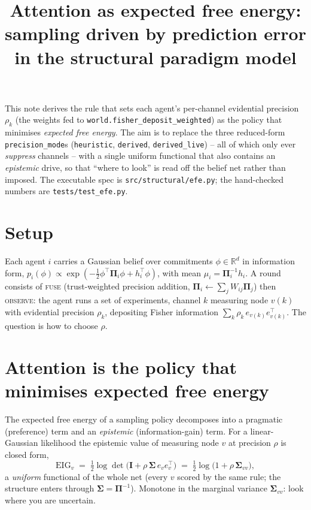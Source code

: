 \documentclass[11pt]{article}
\title{Attention as expected free energy:\\
sampling driven by prediction error in the structural paradigm model}
\author{}
\date{}
\newcommand{\Pib}{\boldsymbol{\Pi}}
\newcommand{\Sib}{\boldsymbol{\Sigma}}
\begin{document}
\maketitle

\noindent
This note derives the rule that sets each agent's per-channel evidential precision
$\rho_k$ (the weights fed to \texttt{world.fisher\_deposit\_weighted}) as the policy that
minimises \emph{expected free energy}. The aim is to replace the three reduced-form
\texttt{precision\_mode}s (\texttt{heuristic}, \texttt{derived}, \texttt{derived\_live}) --
all of which only ever \emph{suppress} channels -- with a single uniform functional that also
contains an \emph{epistemic} drive, so that ``where to look'' is read off the belief net
rather than imposed. The executable spec is \texttt{src/structural/efe.py}; the hand-checked
numbers are \texttt{tests/test\_efe.py}.

\section{Setup}
Each agent $i$ carries a Gaussian belief over commitments $\phi\in\mathbb{R}^d$ in
information form, $p_i(\phi)\propto\exp(-\tfrac12\phi^\top\Pib_i\phi+h_i^\top\phi)$, with
mean $\mu_i=\Pib_i^{-1}h_i$. A round consists of \textsc{fuse} (trust-weighted precision
addition, $\Pib_i\!\leftarrow\!\sum_j W_{ij}\Pib_j$) then \textsc{observe}: the agent runs a
set of experiments, channel $k$ measuring node $v(k)$ with evidential precision $\rho_k$,
depositing Fisher information $\sum_k \rho_k\, e_{v(k)}e_{v(k)}^\top$. The question is how to
choose $\rho$.

\section{Attention is the policy that minimises expected free energy}
The expected free energy of a sampling policy decomposes into a pragmatic (preference) term
and an \emph{epistemic} (information-gain) term. For a linear-Gaussian likelihood the epistemic
value of measuring node $v$ at precision $\rho$ is closed form,
\begin{equation}
\mathrm{EIG}_v \;=\; \tfrac12\log\det\!\big(\mathbf I+\rho\,\Sib\, e_v e_v^\top\big)
\;=\;\tfrac12\log\!\big(1+\rho\,\Sib_{vv}\big),
\label{eq:eig}
\end{equation}
a \emph{uniform} functional of the whole net (every $v$ scored by the same rule; the structure
enters through $\Sib=\Pib^{-1}$). Monotone in the marginal variance $\Sib_{vv}$: look where you
are uncertain.
\end{document}
